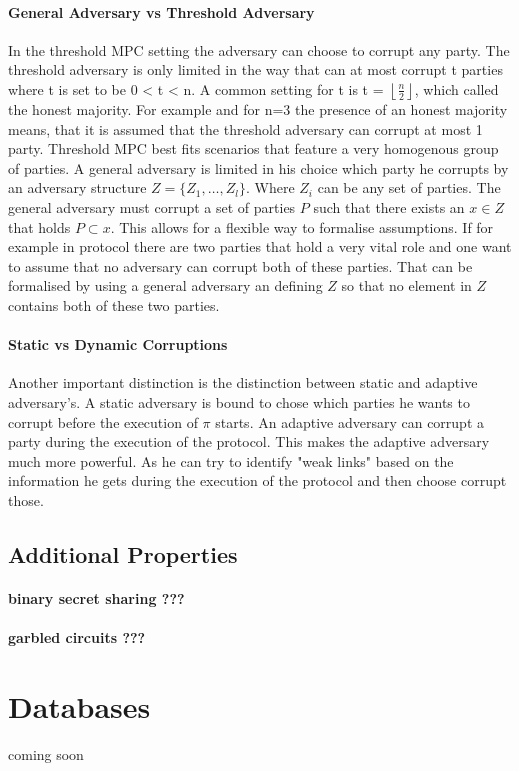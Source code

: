 \paragraph{General Adversary vs Threshold Adversary}
In the threshold MPC setting the adversary can choose to corrupt any party. The threshold adversary is only limited in the way that can at most corrupt t parties where t is set to be 0 < t < n. A common setting for t is t = $\left \lfloor{ \frac{n}{2} }\right \rfloor  $, which called the honest majority. For example and for n=3 the presence of an honest majority means, that it is assumed that the threshold adversary can corrupt at most 1 party. Threshold MPC best fits scenarios that feature a very homogenous group of parties. A general adversary is limited in his choice which party he corrupts by an adversary structure  
$ Z = \{ Z_1, \dots, Z_l  \} $. Where $ Z_i $ can be any set of parties. The general adversary must corrupt a set of parties  $ P $ such that there exists an $ x \in Z $ that holds $ P \subset x $. This allows for a flexible way to formalise assumptions. If for example in protocol there are two parties that hold a very vital role and one want to assume that no adversary can corrupt both of these parties. That can be formalised by using a general adversary an defining $ Z $ so that no element in  $Z $ contains both of these two parties.  
 
\paragraph{Static vs Dynamic Corruptions}
Another important distinction is the distinction between static and adaptive adversary's. A static adversary is bound to chose which parties he wants to corrupt before the execution of $ \pi $ starts. An adaptive adversary can corrupt a party during the execution of the protocol. This makes the adaptive adversary much more powerful. As he can try to identify "weak links" based on the information he gets during the execution of the protocol and then choose corrupt those.   


\subsection{Additional Properties}
\paragraph{binary secret sharing ???} 
\paragraph{garbled circuits ???}

\section{Databases}



coming soon
